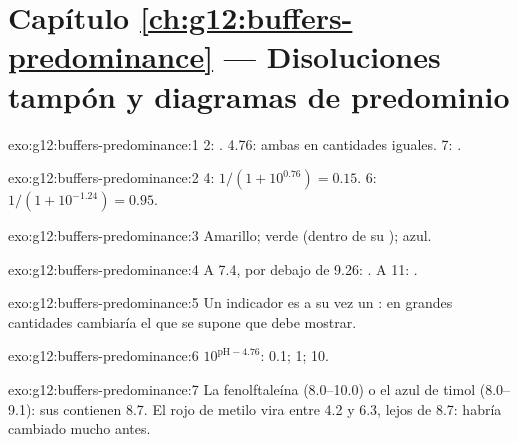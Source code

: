 \section*{Capítulo \ref{ch:g12:buffers-predominance} --- Disoluciones tampón y diagramas de predominio}

\begin{solution}{exo:g12:buffers-predominance:1}
 2: .  4.76: ambas en cantidades iguales.  7:
.
\end{solution}

\begin{solution}{exo:g12:buffers-predominance:2}
 4: $1/(1 + 10^{0.76}) = 0.15$.  6: $1/(1 + 10^{-1.24}) = 0.95$.
\end{solution}

\begin{solution}{exo:g12:buffers-predominance:3}
Amarillo; verde (dentro de su ); azul.
\end{solution}

\begin{solution}{exo:g12:buffers-predominance:4}
A  7.4, por debajo de 9.26: . A  11: .
\end{solution}

\begin{solution}{exo:g12:buffers-predominance:5}
Un indicador es a su vez un : en grandes cantidades
cambiaría el  que se supone que debe mostrar.
\end{solution}

\begin{solution}{exo:g12:buffers-predominance:6}
$10^{\mathrm{pH} - 4.76}$: 0.1; 1; 10.
\end{solution}

\begin{solution}{exo:g12:buffers-predominance:7}
La fenolftaleína (8.0--10.0) o el azul de timol (8.0--9.1): sus  contienen 8.7. El rojo de metilo vira entre 4.2 y 6.3, lejos de
8.7: habría cambiado mucho antes.
\end{solution}

